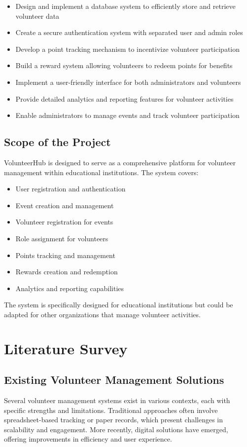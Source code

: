 \documentclass[12pt,a4paper]{report}
\begin{document}
\begin{itemize}
    \item Design and implement a database system to efficiently store and retrieve volunteer data
    \item Create a secure authentication system with separated user and admin roles
    \item Develop a point tracking mechanism to incentivize volunteer participation
    \item Build a reward system allowing volunteers to redeem points for benefits
    \item Implement a user-friendly interface for both administrators and volunteers
    \item Provide detailed analytics and reporting features for volunteer activities
    \item Enable administrators to manage events and track volunteer participation
\end{itemize}

\section{Scope of the Project}
VolunteerHub is designed to serve as a comprehensive platform for volunteer management within educational institutions. The system covers:

\begin{itemize}
    \item User registration and authentication
    \item Event creation and management
    \item Volunteer registration for events
    \item Role assignment for volunteers
    \item Points tracking and management
    \item Rewards creation and redemption
    \item Analytics and reporting capabilities
\end{itemize}

The system is specifically designed for educational institutions but could be adapted for other organizations that manage volunteer activities.

\chapter{Literature Survey}

\section{Existing Volunteer Management Solutions}
Several volunteer management systems exist in various contexts, each with specific strengths and limitations. Traditional approaches often involve spreadsheet-based tracking or paper records, which present challenges in scalability and engagement. More recently, digital solutions have emerged, offering improvements in efficiency and user experience.
\end{document}
